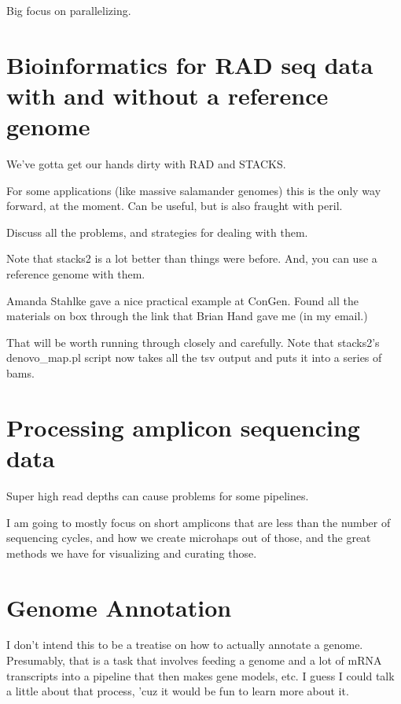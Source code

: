 \documentclass[]{krantz}
\begin{document}
Big focus on parallelizing.

\hypertarget{bioinformatics-for-rad-seq-data-with-and-without-a-reference-genome}{%
\chapter{Bioinformatics for RAD seq data with and without a reference genome}\label{bioinformatics-for-rad-seq-data-with-and-without-a-reference-genome}}

We've gotta get our hands dirty with RAD and STACKS.

For some applications (like massive salamander genomes) this is the only
way forward, at the moment. Can be useful, but is also
fraught with peril.

Discuss all the problems, and strategies for dealing with them.

Note that stacks2 is a lot better than things were before. And, you can use
a reference genome with them.

Amanda Stahlke gave a nice practical example at ConGen. Found all the materials
on box through the link that Brian Hand gave me (in my email.)

That will be worth running through closely and carefully. Note that stacks2's denovo\_map.pl script
now takes all the tsv output and puts it into a series of bams.

\hypertarget{processing-amplicon-sequencing-data}{%
\chapter{Processing amplicon sequencing data}\label{processing-amplicon-sequencing-data}}

Super high read depths can cause problems for some pipelines.

I am going to mostly focus on short amplicons that are less than the
number of sequencing cycles, and how we create microhaps out of those, and
the great methods we have for visualizing and curating those.

\hypertarget{genome-annotation}{%
\chapter{Genome Annotation}\label{genome-annotation}}

I don't intend this to be a treatise on how to actually annotate a genome.
Presumably, that is a task that involves feeding a genome and a lot of mRNA
transcripts into a pipeline that then makes gene models, etc. I guess I could
talk a little about that process, 'cuz it would be fun to learn more about it.
\end{document}
